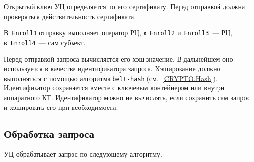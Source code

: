 Открытый ключ УЦ определяется по его сертификату. Перед отправкой 
должна проверяться действительность сертификата.

В~\texttt{Enroll1} отправку выполняет оператор РЦ,
в~\texttt{Enroll2} и~\texttt{Enroll3}~--- РЦ,
в~\texttt{Enroll4}~--- сам субъект.

Перед отправкой запроса вычисляется его хэш-значение. 
В дальнейшем оно используется в качестве идентификатора запроса. 
Хэширование должно выполняться с помощью алгоритма 
\texttt{belt-hash} (см.~\ref{CRYPTO.Hash}).
%
Идентификатор сохраняется вместе с ключевым контейнером или внутри 
аппаратного КТ.
%
Идентификатор можно не вычислять, если сохранить сам запрос и хэшировать 
его при необходимости.

\subsection{Обработка запроса}\label{PROCESSES.Enroll.Issue}

УЦ обрабатывает запрос по следующему алгоритму.

